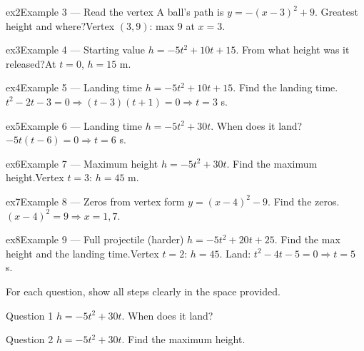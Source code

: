 \documentclass[11pt]{article}
\begin{document}
\begin{example}{ex2}{Example 3 --- Read the vertex}
A ball's path is $y=-(x-3)^2+9$. Greatest height and where?\soln Vertex $(3,9)$: max $9$ at $x=3$.
\end{example}

\begin{example}{ex3}{Example 4 --- Starting value}
$h=-5t^2+10t+15$. From what height was it released?\soln At $t=0$, $h=15$ m.
\end{example}

\begin{example}{ex4}{Example 5 --- Landing time}
$h=-5t^2+10t+15$. Find the landing time.\soln $t^2-2t-3=0\Rightarrow(t-3)(t+1)=0\Rightarrow t=3$ s.
\end{example}

\begin{example}{ex5}{Example 6 --- Landing time}
$h=-5t^2+30t$. When does it land?\soln $-5t(t-6)=0\Rightarrow t=6$ s.
\end{example}

\begin{example}{ex6}{Example 7 --- Maximum height}
$h=-5t^2+30t$. Find the maximum height.\soln Vertex $t=3$: $h=45$ m.
\end{example}

\begin{example}{ex7}{Example 8 --- Zeros from vertex form}
$y=(x-4)^2-9$. Find the zeros.\soln $(x-4)^2=9\Rightarrow x=1,7$.
\end{example}

\begin{example}{ex8}{Example 9 --- Full projectile (harder)}
$h=-5t^2+20t+25$. Find the max height and the landing time.\soln Vertex $t=2$: $h=45$. Land: $t^2-4t-5=0\Rightarrow t=5$ s.
\end{example}

\clearpage
{}
For each question, show all steps clearly in the space provided.

\begin{qbox}{Question 1}
$h=-5t^2+30t$. When does it land?\workspace{2.2cm}
\end{qbox}

\begin{qbox}{Question 2}
$h=-5t^2+30t$. Find the maximum height.\workspace{2.2cm}
\end{qbox}
\end{document}
